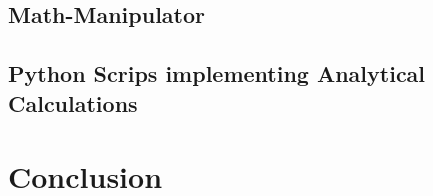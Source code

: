 \documentclass[
headings=optiontohead,              %
12pt,                               %
DIV=13,                             %
twoside=false,                      %
open=right,                         %
BCOR=00mm,                          %
toc=bibliographynumbered            %
]{scrreport}
\begin{document}
    \section{Math-Manipulator}
    \label{sec:implementation-math-manipulator}
    
    \FloatBarrier
        
        

    \section{Python Scrips implementing Analytical Calculations}
    \label{sec:implementation-analytical-calculations}
    
    \FloatBarrier
            
        

\chapter{Conclusion}
\label{sec:conclusion}

\FloatBarrier



\end{document}
